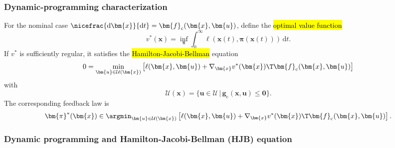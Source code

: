 \begin{frame}
	\frametitle{Dynamic-programming characterization}
	For the nominal case $\nicefrac{\mathrm{d}\bm{x}}{\mathrm{d}t}=\bm{f}_\mathrm{c}(\bm{x},\bm{u})$, define the \hl{optimal value function}
	\begin{equation}
		v^*(\bm{x})=
		\inf_{\bm{\pi}}
		\int_0^\infty
		\ell(\bm{x}(t),\bm{\pi}(\bm{x}(t)))\,\mathrm{d}t .
		\label{eq:ocp_value_function_ct}
	\end{equation}\pause
	If $v^*$ is sufficiently regular, it satisfies the \hl{Hamilton-Jacobi-Bellman} equation
	\begin{equation}
		0=
		\min_{\bm{u}\in\mathcal{U}(\bm{x})}
		\left[
			\ell(\bm{x},\bm{u})+
			\nabla_{\bm{x}}v^*(\bm{x})\T \bm{f}_\mathrm{c}(\bm{x},\bm{u})
			\right]
		\label{eq:hjb_equation}
	\end{equation}
	with
	\begin{equation}
		\mathcal{U}(\bm{x})=\{\bm{u}\in\mathcal{U}\,|\,\bm{g}_\mathrm{c}(\bm{x},\bm{u})\leq\bm{0}\} .
	\end{equation}\pause%
	The corresponding feedback law is
	\begin{equation}
		\bm{\pi}^*(\bm{x})\in
		\argmin_{\bm{u}\in\mathcal{U}(\bm{x})}
		\left[
			\ell(\bm{x},\bm{u})+
			\nabla_{\bm{x}}v^*(\bm{x})\T \bm{f}_\mathrm{c}(\bm{x},\bm{u})
			\right].
	\end{equation}
\end{frame}

\subsubsection{Dynamic programming and Hamilton-Jacobi-Bellman (HJB) equation}

